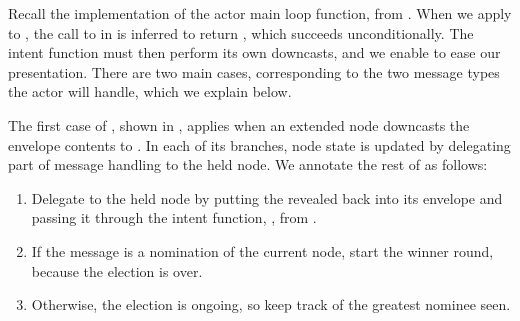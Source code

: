 \documentclass[sigplan,screen]{acmart}
\begin{document}
Recall the implementation of the actor main loop function,
 from .
%
When we apply  to ,
the call to  in 
is inferred to return ,
which succeeds unconditionally.
%
The  intent function must then perform its own downcasts,
and we enable  to ease our presentation.
%
There are two main cases,
corresponding to the two message types the actor will handle,
which we explain below.


The first case of , shown in , applies
when an extended node downcasts the envelope contents to .
%
In each of its branches, node state is updated by delegating part of message
handling to the held node.
%
We annotate the rest of  as follows:
%
\begin{enumerate}[leftmargin=2em]
    \item Delegate to the held node by putting the revealed  back
    into its envelope and passing it through the intent function, ,
    from .
    \item If the message is a nomination of the current node, start
    the winner round, because the election is over.
    \item Otherwise, the election is ongoing, so keep track of the greatest
    nominee seen.
\end{enumerate}
%
\end{document}
